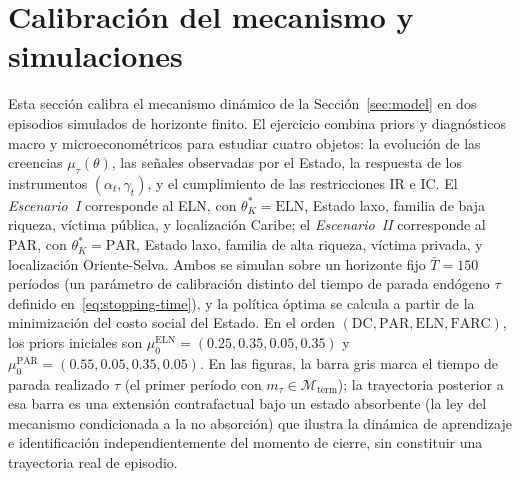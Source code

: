 \documentclass[review,authoryear,12pt]{elsarticle}
\theoremstyle{plain}
\theoremstyle{definition}
\newcommand{\1}{\mathbf{1}}
\begin{document}
\section{Calibración del mecanismo y simulaciones}\label{sec:calibracion}
\normalfont\normalsize
Esta sección calibra el mecanismo dinámico de la Sección~\ref{sec:model} en dos episodios simulados de horizonte finito. El ejercicio combina priors y diagnósticos macro y microeconométricos para estudiar cuatro objetos: la evolución de las creencias $\mu_\tau(\theta)$, las señales observadas por el Estado, la respuesta de los instrumentos $(\alpha_t,\gamma_t)$, y el cumplimiento de las restricciones IR e IC. El \emph{Escenario~I} corresponde al ELN, con $\theta_K^\ast=\mathrm{ELN}$, Estado laxo, familia de baja riqueza, víctima pública, y localización Caribe; el \emph{Escenario~II} corresponde al PAR, con $\theta_K^\ast=\mathrm{PAR}$, Estado laxo, familia de alta riqueza, víctima privada, y localización Oriente-Selva. Ambos se simulan sobre un horizonte fijo $\bar{T}=150$ períodos (un parámetro de calibración distinto del tiempo de parada endógeno $\tau$ definido en~\eqref{eq:stopping-time}), y la política óptima se calcula a partir de la minimización del costo social del Estado. En el orden $(\mathrm{DC},\mathrm{PAR},\mathrm{ELN},\mathrm{FARC})$, los priors iniciales son $\mu_0^{\mathrm{ELN}}=(0.25,0.35,0.05,0.35)$ y $\mu_0^{\mathrm{PAR}}=(0.55,0.05,0.35,0.05)$. En las figuras, la barra gris marca el tiempo de parada realizado $\tau$ (el primer período con $m_\tau\in\mathcal{M}_{\mathrm{term}}$); la trayectoria posterior a esa barra es una extensión contrafactual bajo un estado absorbente (la ley del mecanismo condicionada a la no absorción) que ilustra la dinámica de aprendizaje e identificación independientemente del momento de cierre, sin constituir una trayectoria real de episodio.
\end{document}
